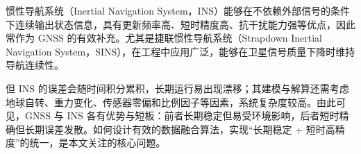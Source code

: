 惯性导航系统（Inertial Navigation System，INS）能够在不依赖外部信号的条件下连续输出状态信息，具有更新频率高、短时精度高、抗干扰能力强等优点，因此常作为 GNSS 的有效补充。尤其是捷联惯性导航系统（Strapdown Inertial Navigation System，SINS），在工程中应用广泛，能够在卫星信号质量下降时维持导航连续性。

但 INS 的误差会随时间积分累积，长期运行易出现漂移；其建模与解算还需考虑地球自转、重力变化、传感器零偏和比例因子等因素，系统复杂度较高\cite{yan2019strapdown}。由此可见，GNSS 与 INS 各有优势与短板：前者长期稳定但易受环境影响，后者短时精确但长期误差发散。如何设计有效的数据融合算法，实现“长期稳定 + 短时高精度”的统一，是本文关注的核心问题。





